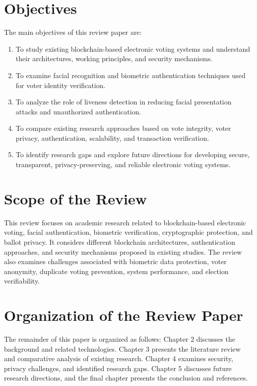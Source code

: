 \documentclass[12pt]{report}
\begin{document}
	\section{Objectives}
	The main objectives of this review paper are:
	\begin{enumerate}
		\item To study existing blockchain-based electronic voting systems and understand their architectures, working principles, and security mechanisms.
		\item To examine facial recognition and biometric authentication techniques used for voter identity verification.
		\item To analyze the role of liveness detection in reducing facial presentation attacks and unauthorized authentication.
		\item To compare existing research approaches based on vote integrity, voter privacy, authentication, scalability, and transaction verification.
		\item To identify research gaps and explore future directions for developing secure, transparent, privacy-preserving, and reliable electronic voting systems.
	\end{enumerate}
	
	\section{Scope of the Review}
	This review focuses on academic research related to blockchain-based electronic voting, facial authentication, biometric verification, cryptographic protection, and ballot privacy. It considers different blockchain architectures, authentication approaches, and security mechanisms proposed in existing studies. The review also examines challenges associated with biometric data protection, voter anonymity, duplicate voting prevention, system performance, and election verifiability.
	
	\section{Organization of the Review Paper}
	The remainder of this paper is organized as follows: Chapter 2 discusses the background and related technologies. Chapter 3 presents the literature review and comparative analysis of existing research. Chapter 4 examines security, privacy challenges, and identified research gaps. Chapter 5 discusses future research directions, and the final chapter presents the conclusion and references.
	
\end{document}
